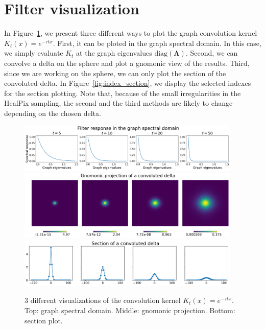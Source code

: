 \documentclass[final,twocolumn,3p,times,authoryear]{elsarticle}
\renewcommand{\b}[1]{{\bm{#1}}}   %
\newcommand{\1}{\b{1}}              %
\newcommand{\0}{\b{0}}              %
\newcommand{\bLambda}{\b{\Lambda}}
\begin{document}
\section{Filter visualization}
\label{app:filter_visualization}

In Figure~\ref{fig:gaussian_filters_visualization}, we present three different
ways to plot the graph convolution kernel $K_t(x)=e^{-\tau t x}$.  First, it can
be ploted in the graph spectral domain. In this case, we simply evaluate $K_t$
at the graph eigenvalues $\text{diag}(\bLambda)$. Second, we can convolve a
delta on the sphere and plot a gnomonic view of the results. Third, since we are
working on the sphere, we can only plot the section of the convoluted delta. In
Figure~\ref{fig:index_section}, we display the selected indexes for the section
plotting. Note that, because of the small irregularities in the HealPix
sampling, the second and the third methods are likely to change depending on the
chosen delta.

\begin{figure}[!ht]
\centering
\includegraphics[width=0.95\textwidth]{figures/gaussian_filters_spectral.pdf}
\includegraphics[width=0.95\textwidth]{figures/gaussian_filters_gnomonic.pdf}
\includegraphics[width=0.95\textwidth]{figures/gaussian_filters_section.pdf}
\caption{3 different visualizations of the convolution kernel $K_t(x)=e^{-\tau t x}$.  
Top: graph spectral domain. 
Middle: gnomonic projection.
Bottom: section plot.}
\label{fig:gaussian_filters_visualization}
\end{figure}
\end{document}
